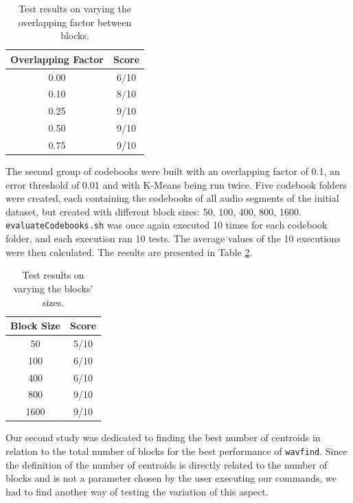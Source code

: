 \documentclass[12pt]{article}
\begin{document}
\begin{table}[H]
  \begin{center}
    \begin{tabular}{c|c}
      \textbf{Overlapping Factor} & \textbf{Score}\\
      \hline
      0.00 & 6/10\\
      0.10 & 8/10\\
      0.25 & 9/10\\
      0.50 & 9/10\\
      0.75 & 9/10\\
    \end{tabular}
  \end{center}
  \caption{Test results on varying the overlapping factor between blocks.}
  \label{tab:overlapFactor}
\end{table}

The second group of codebooks were built with an overlapping factor of 0.1, an 
error threshold of 0.01 and with K-Means being run twice.
Five codebook folders were created, each containing the codebooks of all audio
segments of the initial dataset, but created with different block sizes:
50, 100, 400, 800, 1600. 
\texttt{evaluateCodebooks.sh} was once again executed 10 times for each codebook
folder, and each execution ran 10 tests.
The average values of the 10 executions were then calculated.
The results are presented in Table \ref{tab:blockSize}.

\begin{table}[H]
  \begin{center}
    \begin{tabular}{c|c}
      \textbf{Block Size} & \textbf{Score}\\
      \hline
      50 & 5/10\\
      100 & 6/10\\
      400 & 6/10\\
      800 & 9/10\\
      1600 & 9/10\\
    \end{tabular}
  \end{center}
  \caption{Test results on varying the blocks' sizes.}
  \label{tab:blockSize}
\end{table}

Our second study was dedicated to finding the best number of centroids in relation
to the total number of blocks for the best performance of \texttt{wavfind}.
Since the definition of the number of centroids is directly related to the number
of blocks and is not a parameter chosen by the user executing our commands,
we had to find another way of testing the variation of this aspect.
\end{document}
